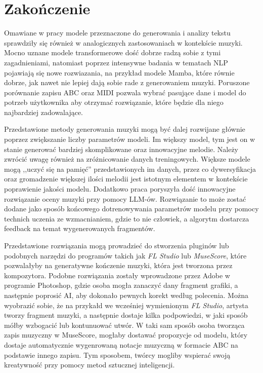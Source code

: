 \documentclass[data-science]{agh-wi} %
\begin{document}
\chapter{Zakończenie}

Omawiane w pracy modele przeznaczone do generowania i analizy tekstu sprawdziły się również w analogicznych zastosowaniach w kontekście muzyki. Mocno uznane modele transformerowe dość dobrze radzą sobie z tymi zagadnieniami, natomiast poprzez intensywne badania w tematach NLP pojawiają się nowe rozwiazania, na przykład modele Mamba, które równie dobrze, jak nawet nie lepiej dają sobie rade z generowaniem muzyki. Poruszone porównanie zapisu ABC oraz MIDI pozwala wybrać pasujące dane i model do potrzeb użytkownika aby otrzymać rozwiązanie, które będzie dla niego najbardziej zadowalające.

Przedstawione metody generowania muzyki mogą być dalej rozwijane głównie poprzez zwiększanie liczby parametrów modeli. Im większy model, tym jest on w stanie generować bardziej skomplikowane oraz innowacyjne melodie. Należy zwrócić uwagę również na zróżnicowanie danych treningowych. Większe modele mogą ,,uczyć się na pamięć'' przedstawionych im danych, przez co dywersyfikacja oraz gromadzenie większej ilości melodii jest istotnym elementem w kontekście poprawienie jakości modelu. Dodatkowo praca poryszyła dość innowacyjne rozwiązanie oceny muzyki przy pomocy LLM-ów. Rozwiązanie to może zostać dodane jako sposób końcowego dotrenowywania parametrów modelu przy pomocy technich uczenia ze wzmacnianiem, gdzie to nie człowiek, a algorytm dostarcza feedback na temat wygenerowanych fragmentów.

Przedstawione rozwiązania mogą prowadzieć do stworzenia pluginów lub podobnych narzędzi do programów takich jak \textit{FL Studio} lub \textit{MuseScore}, które pozwalałyby na generatywne kończenie muzyki, która jest tworzona przez kompozytora. Podobne rozwiązania zostały wprowadzone przez Adobe w programie Photoshop, gdzie osoba mogła zanaczyć dany fragment grafiki, a następnie poprosić AI, aby dokonało pewnych korekt według polecenia. Można wyobrazić sobie, że na przykałd we wcześniej wymienionym \textit{FL Studio}, artysta tworzy fragment muzyki, a następnie dostaje kilka podpowiedzi, w jaki sposób mółby wzbogacić lub kontunuować utwór. W taki sam sposób osoba tworząca zapis muzyczny w MuseScore, mogłaby dostawać propozycje od modelu, który dostaje automatycznie wygenrowaną notacje muzyczną w formacie ABC na podstawie innego zapisu. Tym sposobem, twórcy mogliby wspierać swoją kreatywność przy pomocy metod sztucznej inteligencji.
\end{document}
